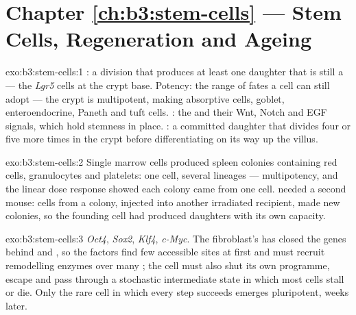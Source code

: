 \section*{Chapter \ref{ch:b3:stem-cells} --- Stem Cells, Regeneration and Ageing}

\begin{solution}{exo:b3:stem-cells:1}
: a division that produces at least one daughter that is
still a  --- the \emph{Lgr5} cells at the crypt base. Potency:
the range of fates a cell can still adopt --- the crypt  is
multipotent, making absorptive cells, goblet, enteroendocrine, Paneth
and tuft cells. : the  and their Wnt, Notch and EGF
signals, which hold stemness in place. : a
committed daughter that divides four or five more times in the crypt
before differentiating on its way up the villus.
\end{solution}

\begin{solution}{exo:b3:stem-cells:2}
Single marrow cells produced spleen colonies containing red cells,
granulocytes and platelets: one cell, several lineages ---
multipotency, and the linear dose response showed each colony came from
one cell.  needed a second mouse: cells from a colony,
injected into another irradiated recipient, made new colonies, so the
founding cell had produced daughters with its own capacity.
\end{solution}

\begin{solution}{exo:b3:stem-cells:3}
\emph{Oct4}, \emph{Sox2}, \emph{Klf4}, \emph{c-Myc}. The fibroblast's
 has closed the  genes behind  and
, so the factors find few accessible sites at first and
must recruit remodelling enzymes over many ; the cell must
also shut its own programme, escape  and pass through a
stochastic intermediate state in which most cells stall or die. Only
the rare cell in which every step succeeds emerges pluripotent, weeks
later.
\end{solution}

